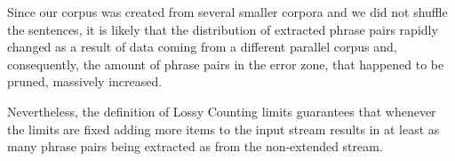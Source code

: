 Since our corpus was created from several smaller corpora and we did not shuffle the sentences,
it is likely that the distribution of extracted phrase pairs rapidly changed as a result of data
coming from a different parallel corpus and, consequently, the amount of phrase pairs in the error zone,
that happened to be pruned, massively increased.

Nevertheless, the definition of Lossy Counting limits guarantees that
whenever the limits are fixed adding more items to the input stream results in at least
as many phrase pairs being extracted as from the non-extended stream.

